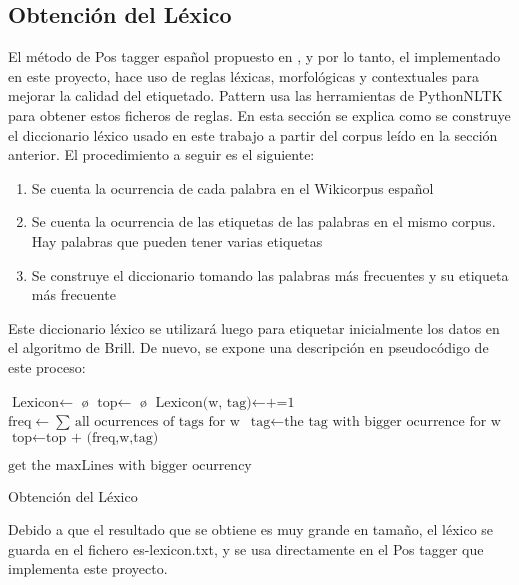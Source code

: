 \subsection{Obtención del Léxico}
El método de Pos tagger español propuesto en \citet{smedt2012pattern}, y por lo tanto, el implementado en este proyecto, hace uso de reglas léxicas, morfológicas y contextuales para mejorar la calidad del etiquetado. \textcolor{SchoolColor}{Pattern} usa las herramientas de \textcolor{SchoolColor}{PythonNLTK} para obtener estos ficheros de reglas. En esta sección se explica como se construye el diccionario léxico usado en este trabajo a partir del corpus leído en la sección anterior.\newline 
El procedimiento a seguir es el siguiente:
\begin{enumerate}
\item Se cuenta la ocurrencia de cada palabra en el Wikicorpus español
\item Se cuenta la ocurrencia de las etiquetas de las palabras en el mismo corpus. Hay palabras que pueden tener varias etiquetas
\item Se construye el diccionario tomando las palabras más frecuentes y su etiqueta más frecuente
\end{enumerate}
Este diccionario léxico se utilizará luego para etiquetar inicialmente los datos en el algoritmo de Brill. De nuevo, se expone una descripción en pseudocódigo de este proceso:
\begin{algorithm}[H]
    \begin{algorithmic}[1]
    \State $\text{Lexicon} \gets$ \o
    \State $\text{top} \gets$ \o
            \State $\text{Lexicon(w, tag)} \gets \text{+=1}$
            \EndFor
    \EndFor        
            \State $\text{freq} \gets \text{$\sum$ all ocurrences of tags for w}$
             \State $\text{tag} \gets \text{the tag with bigger ocurrence for w}$
             \State $\text{top} \gets \text{top + (freq,w,tag) }$
            \EndFor
            
     \State $\text{get the maxLines with bigger ocurrency}$      
        \EndProcedure
    \end{algorithmic}
    \label{alg:rAP}
    \caption{Obtención del Léxico}
\end{algorithm}
Debido a que el resultado que se obtiene es muy grande en tamaño, el léxico se guarda en el fichero  \textcolor{SchoolColor}{es-lexicon.txt}, y se usa directamente en el Pos tagger que implementa este proyecto.\\[\baselineskip]
